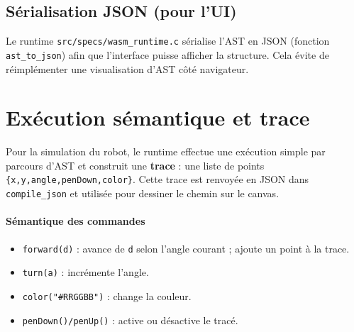 \documentclass[11pt,a4paper]{article}
\begin{document}
\subsection{Sérialisation JSON (pour l'UI)}
Le runtime \texttt{src/specs/wasm\_runtime.c} sérialise l'AST en JSON (fonction \texttt{ast\_to\_json}) afin que l'interface puisse afficher la structure. Cela évite de réimplémenter une visualisation d'AST côté navigateur.

\section{Exécution sémantique et trace}
Pour la simulation du robot, le runtime effectue une exécution simple par parcours d'AST et construit une \textbf{trace} : une liste de points \texttt{\{x,y,angle,penDown,color\}}. Cette trace est renvoyée en JSON dans \texttt{compile\_json} et utilisée pour dessiner le chemin sur le canvas.

\paragraph{Sémantique des commandes}
\begin{itemize}
  \item \texttt{forward(d)} : avance de \texttt{d} selon l'angle courant ; ajoute un point à la trace.
  \item \texttt{turn(a)} : incrémente l'angle.
  \item \texttt{color("#RRGGBB")} : change la couleur.
  \item \texttt{penDown()/penUp()} : active ou désactive le tracé.
\end{itemize}
\end{document}
